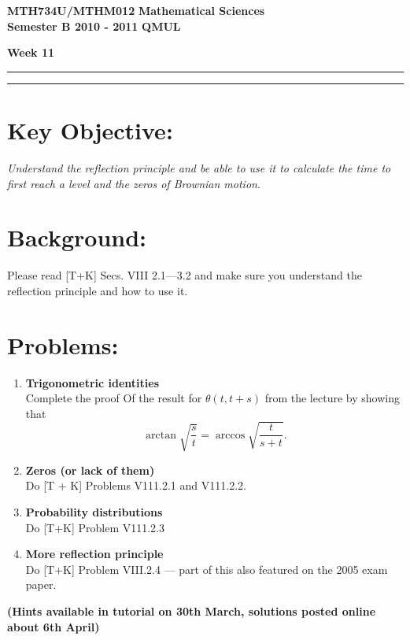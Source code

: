 \documentclass[11pt,a4paper]{article}
\begin{document}
  \textbf{MTH734U/MTHM012} \hfill \textbf{Mathematical Sciences}\\
  \textbf{Semester B 2010 - 2011} \hfill \textbf{QMUL}
  \begin{center}
    \textbf{\huge Week 11}
  \end{center}
  \hrule \vspace{2mm} \hrule

  \section*{Key Objective:}
  \textit{Understand the reflection principle and be able to use it to calculate the time to first reach a level and the zeros of Brownian motion}.

  \section*{Background:}
  Please read [T+K] Secs. VIII 2.1—3.2 and make sure you understand the reflection principle and how to use it.
  \newpage

  \section*{Problems:}
  \begin{enumerate}
    \item \textbf{Trigonometric identities}\\
    Complete the proof Of the result for $\theta(t, t + s)$ from the lecture by showing that
    $$
    \arctan\sqrt{\frac{s}{t}} = \arccos\sqrt{\frac{t}{s + t}}.
    $$
    \item \textbf{Zeros (or lack of them)}\\
    Do [T + K] Problems V111.2.1 and V111.2.2.
    \item \textbf{Probability distributions}\\
    Do [T+K] Problem V111.2.3
    \item \textbf{More reflection principle}\\
    Do [T+K] Problem VIII.2.4 — part of this also featured on the 2005 exam paper.\par 
    [Note that the question in the book contains an obvious typo (the "m" at the very bottom of page 497 should be a "z"); don't forget to answer the part overleaf as well...]
  \end{enumerate}
  \textbf{(Hints available in tutorial on 30th March, solutions posted online about 6th April)}
  \newpage
\end{document}
